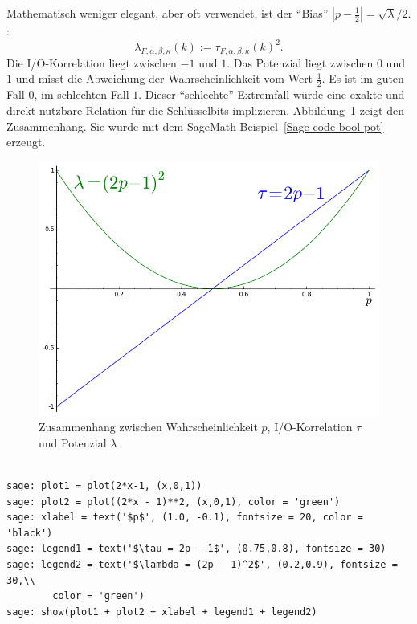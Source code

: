 \begin{refsegment}
{   Mathematisch weniger elegant, aber oft verwendet, ist der
   "`Bias"' $\left| p - \frac{1}{2} \right| = \sqrt{\lambda}/2$.
}:
\[
   \lambda_{F,\alpha,\beta,\kappa}(k) := \tau_{F,\alpha,\beta,\kappa}(k)^2.
\]
Die I/O-Korrelation liegt zwischen $-1$ und $1$.
Das Potenzial liegt zwischen $0$ und $1$ und misst die Abweichung
der Wahrscheinlichkeit vom Wert $\frac{1}{2}$. Es ist im guten
Fall $0$, im schlechten Fall $1$. Dieser "`schlechte"' Extremfall
würde eine exakte und direkt nutzbare Relation für die Schlüsselbits
implizieren. Abbildung~\ref{fig-bool-pot} zeigt den Zusammenhang.
Sie wurde mit dem SageMath-Beispiel~\ref{Sage-code-bool-pot} erzeugt.

\begin{figure}[htbp]
\begin{center}
\includegraphics[scale=0.5]{figures/BC_Potenzial2.png}
\end{center}
\caption{Zusammenhang zwischen Wahrscheinlichkeit $p$,
   I/O-Korrela\-tion $\tau$ und
   Potenzial $\lambda$}\label{fig-bool-pot}
\end{figure}

\begin{sagecode}
\begin{verbatim}

sage: plot1 = plot(2*x-1, (x,0,1))
sage: plot2 = plot((2*x - 1)**2, (x,0,1), color = 'green')
sage: xlabel = text('$p$', (1.0, -0.1), fontsize = 20, color = 'black')
sage: legend1 = text('$\tau = 2p - 1$', (0.75,0.8), fontsize = 30)
sage: legend2 = text('$\lambda = (2p - 1)^2$', (0.2,0.9), fontsize = 30,\\
        color = 'green')
sage: show(plot1 + plot2 + xlabel + legend1 + legend2)
\end{verbatim}
\caption{Plot von I/O-Korrelation und
   Potenzial}\label{Sage-code-bool-pot}
\end{sagecode}


\end{refsegment}
